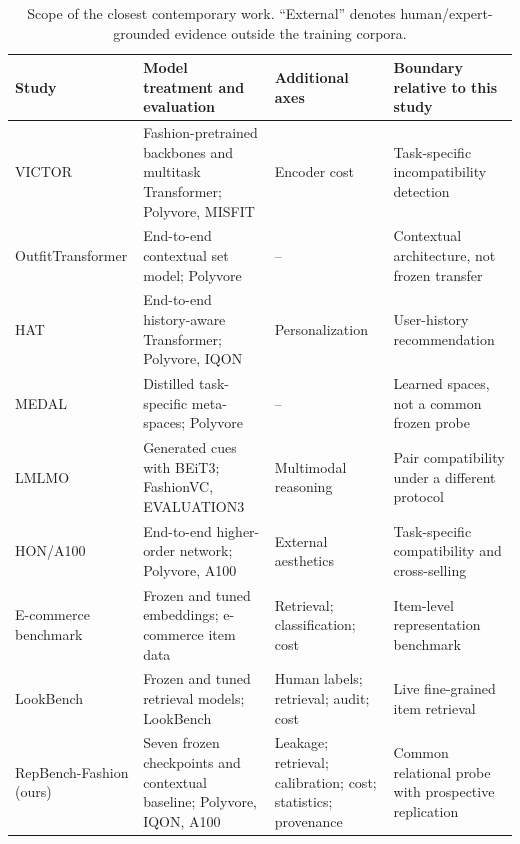 \documentclass[preprint,12pt]{elsarticle}
\begin{document}
\begin{table}[htbp]
\caption{Scope of the closest contemporary work. ``External'' denotes human/expert-grounded evidence outside the training corpora.}
\label{tab:closest}
\centering\footnotesize
\setlength{\tabcolsep}{4pt}\renewcommand{\arraystretch}{1.12}
\begin{tabularx}{\textwidth}{@{}>{\raggedright\arraybackslash}p{}>{\raggedright\arraybackslash}p{}>{\raggedright\arraybackslash}p{}>{\raggedright\arraybackslash}X@{}}
\toprule
Study & Model treatment and evaluation & Additional axes & Boundary relative to this study \\
\midrule
VICTOR \cite{papadopoulos2023victor} & Fashion-pretrained backbones and multitask Transformer; Polyvore, MISFIT & Encoder cost & Task-specific incompatibility detection \\
OutfitTransformer \cite{sarkar2023outfittransformer} & End-to-end contextual set model; Polyvore & -- & Contextual architecture, not frozen transfer \\
HAT \cite{jung2025hat} & End-to-end history-aware Transformer; Polyvore, IQON & Personalization & User-history recommendation \\
MEDAL \cite{sanny2026medal} & Distilled task-specific meta-spaces; Polyvore & -- & Learned spaces, not a common frozen probe \\
LMLMO \cite{chang2025large} & Generated cues with BEiT3; FashionVC, EVALUATION3 & Multimodal reasoning & Pair compatibility under a different protocol \\
HON/A100 \cite{pang2026crossselling} & End-to-end higher-order network; Polyvore, A100 & External aesthetics & Task-specific compatibility and cross-selling \\
E-commerce benchmark \cite{czerwinska2025ecommerce} & Frozen and tuned embeddings; e-commerce item data & Retrieval; classification; cost & Item-level representation benchmark \\
LookBench \cite{gao2026lookbench} & Frozen and tuned retrieval models; LookBench & Human labels; retrieval; audit; cost & Live fine-grained item retrieval \\
RepBench-Fashion (ours) & Seven frozen checkpoints and contextual baseline; Polyvore, IQON, A100 & Leakage; retrieval; calibration; cost; statistics; provenance & Common relational probe with prospective replication \\
\bottomrule
\end{tabularx}
\end{table}
\end{document}

